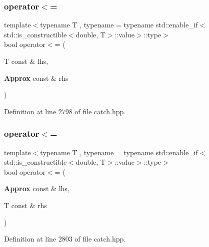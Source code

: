 \mbox{\label{class_catch_1_1_detail_1_1_approx_a0369de03e81bc2ceaf6c9d830476bd49}} 
\subsubsection{operator$<$=\hspace{0.1cm}{\footnotesize\ttfamily [1/2]}}
{\footnotesize\ttfamily template$<$typename T , typename  = typename std\+::enable\+\_\+if$<$std\+::is\+\_\+constructible$<$double, T$>$\+::value$>$\+::type$>$ \\
bool operator$<$= (\begin{DoxyParamCaption}\item[{T const \&}]{lhs,  }\item[{\textbf{ Approx} const \&}]{rhs }\end{DoxyParamCaption})\hspace{0.3cm}{\ttfamily [friend]}}



Definition at line 2798 of file catch.\+hpp.

\mbox{\label{class_catch_1_1_detail_1_1_approx_a6040b908588745570847d7ae8483b091}} 
\subsubsection{operator$<$=\hspace{0.1cm}{\footnotesize\ttfamily [2/2]}}
{\footnotesize\ttfamily template$<$typename T , typename  = typename std\+::enable\+\_\+if$<$std\+::is\+\_\+constructible$<$double, T$>$\+::value$>$\+::type$>$ \\
bool operator$<$= (\begin{DoxyParamCaption}\item[{\textbf{ Approx} const \&}]{lhs,  }\item[{T const \&}]{rhs }\end{DoxyParamCaption})\hspace{0.3cm}{\ttfamily [friend]}}



Definition at line 2803 of file catch.\+hpp.

\mbox{\label{class_catch_1_1_detail_1_1_approx_ab38782a37d09b527ca5e126dbf433dda}} 
